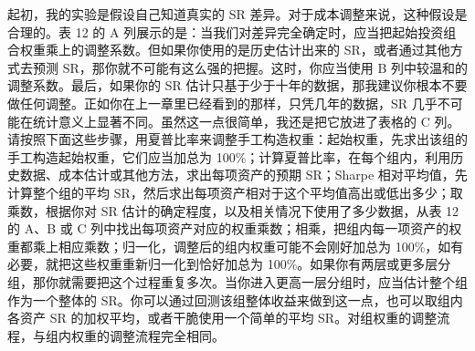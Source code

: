 \begin{chinesetableblock} \begingroup \small \centering
{}
\par \endgroup \end{chinesetableblock}

\begin{chineseblock}起初，我的实验是假设自己知道真实的 SR 差异。对于成本调整来说，这种假设是合理的。表 12 的 A 列展示的是：当我们对差异完全确定时，应当把起始投资组合权重乘上的调整系数。但如果你使用的是历史估计出来的 SR，或者通过其他方式去预测 SR，那你就不可能有这么强的把握。这时，你应当使用 B 列中较温和的调整系数。最后，如果你的 SR 估计只基于少于十年的数据，那我建议你根本不要做任何调整。正如你在上一章里已经看到的那样，只凭几年的数据，SR 几乎不可能在统计意义上显著不同。虽然这一点很简单，我还是把它放进了表格的 C 列。请按照下面这些步骤，用夏普比率来调整手工构造权重：起始权重，先求出该组的手工构造起始权重，它们应当加总为 100\%；计算夏普比率，在每个组内，利用历史数据、成本估计或其他方法，求出每项资产的预期 SR；Sharpe 相对平均值，先计算整个组的平均 SR，然后求出每项资产相对于这个平均值高出或低出多少；取乘数，根据你对 SR 估计的确定程度，以及相关情况下使用了多少数据，从表 12 的 A、B 或 C 列中找出每项资产对应的权重乘数；相乘，把组内每一项资产的权重都乘上相应乘数；归一化，调整后的组内权重可能不会刚好加总为 100\%，如有必要，就把这些权重重新归一化到恰好加总为 100\%。如果你有两层或更多层分组，那你就需要把这个过程重复多次。当你进入更高一层分组时，应当估计整个组作为一个整体的 SR。你可以通过回测该组整体收益来做到这一点，也可以取组内各资产 SR 的加权平均，或者干脆使用一个简单的平均 SR。对组权重的调整流程，与组内权重的调整流程完全相同。\end{chineseblock}

